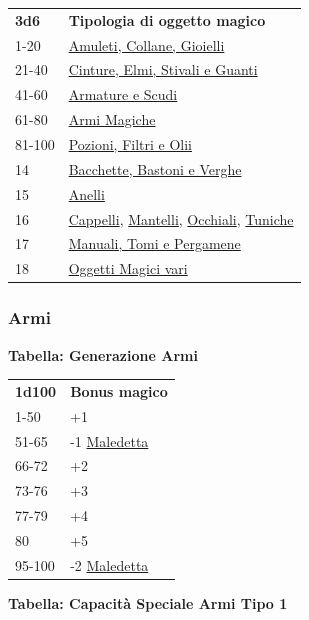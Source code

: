 \begin{multicols}{2}
{{\small \begin{tabular}{ll}
\textbf{3d6}& \textbf{Tipologia di oggetto magico}\\
1-20 &\hyperlink{amuleticollanegioielli}{Amuleti, Collane, Gioielli}\\
21-40 &\hyperlink{cintureelmi}{Cinture, Elmi, Stivali e Guanti}\\
41-60 &\hyperlink{armatureescudi}{Armature e Scudi}\\
61-80 &\hyperlink{armimagiche}{Armi Magiche}\\
81-100 &\hyperlink{pozionifiltri}{Pozioni, Filtri e Olii}\\
14&\hyperlink{bastonibacchette}{Bacchette, Bastoni e Verghe}\\
15&\hyperlink{anellimagici}{Anelli}\\
16&\hyperlink{Cappelli}{Cappelli}, \hyperlink{Mantelli}{Mantelli}, \hyperlink{OcchialidaNotte}{Occhiali}, \hyperlink{Tuniche}{Tuniche}\\
17&\hyperlink{manualitomi}{Manuali, Tomi e Pergamene}\\
18&\hyperlink{oggettimagicivari}{Oggetti Magici vari}
\end{tabular}}

\subsubsection{Armi}

\textbf{Tabella: Generazione Armi}\hypertarget{armimagiche}{}\label{armimagiche}

\medskip

{\small\begin{tabularx}{0.45\textwidth}{lX}
\textbf{1d100} & \textbf{Bonus magico}\\
1-50 &+1\\
51-65 & -1 \hyperlink{Arma maledetta}{Maledetta}\\
66-72 & +2\\
73-76 & +3\\
77-79 & +4\\
80 &+5\\
95-100 &-2 \hyperlink{Arma maledetta}{Maledetta}\\
\end{tabularx}}




\textbf{Tabella: Capacità Speciale Armi Tipo 1}\hypertarget{Capacità Speciale Armi Tipo 1}{}

}
\end{multicols}
